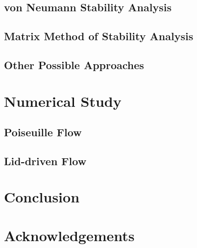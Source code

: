 \documentclass{article}
\begin{document}
\subsection{von Neumann Stability Analysis}

\subsection{Matrix Method of Stability Analysis}

\subsection{Other Possible Approaches}

\section{Numerical Study}

\subsection{Poiseuille Flow} 

\subsection{Lid-driven Flow}

\section{Conclusion}

\section*{Acknowledgements}



	
\end{document}
